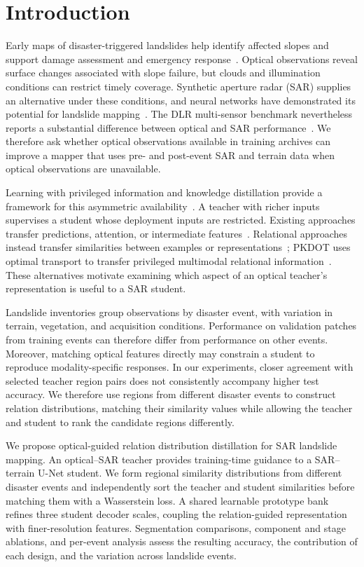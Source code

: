 \documentclass[journal]{IEEEtran}
\begin{document}
\section{Introduction}
Early maps of disaster-triggered landslides help identify affected slopes and support damage assessment and emergency response~\cite{Mondini2021,Handwerger2022,Amatya2023}. Optical observations reveal surface changes associated with slope failure, but clouds and illumination conditions can restrict timely coverage. Synthetic aperture radar (SAR) supplies an alternative under these conditions, and neural networks have demonstrated its potential for landslide mapping~\cite{Nava2022DL,Nava2022Attention,Boehm2022}. The DLR multi-sensor benchmark nevertheless reports a substantial difference between optical and SAR performance~\cite{Orynbaikyzy2025}. We therefore ask whether optical observations available in training archives can improve a mapper that uses pre- and post-event SAR and terrain data when optical observations are unavailable.

Learning with privileged information and knowledge distillation provide a framework for this asymmetric availability~\cite{LopezPaz2016,Hinton2015}. A teacher with richer inputs supervises a student whose deployment inputs are restricted. Existing approaches transfer predictions, attention, or intermediate features~\cite{Zagoruyko2017,Lan2025ACAM,Kieu2026DIS2,Sun2027}. Relational approaches instead transfer similarities between examples or representations~\cite{Park2019RKD,Tung2019SP}; PKDOT uses optimal transport to transfer privileged multimodal relational information~\cite{Aslam2024PKDOT}. These alternatives motivate examining which aspect of an optical teacher's representation is useful to a SAR student.

Landslide inventories group observations by disaster event, with variation in terrain, vegetation, and acquisition conditions. Performance on validation patches from training events can therefore differ from performance on other events. Moreover, matching optical features directly may constrain a student to reproduce modality-specific responses. In our experiments, closer agreement with selected teacher region pairs does not consistently accompany higher test accuracy. We therefore use regions from different disaster events to construct relation distributions, matching their similarity values while allowing the teacher and student to rank the candidate regions differently.

We propose optical-guided relation distribution distillation for SAR landslide mapping. An optical--SAR teacher provides training-time guidance to a SAR--terrain U-Net student. We form regional similarity distributions from different disaster events and independently sort the teacher and student similarities before matching them with a Wasserstein loss. A shared learnable prototype bank refines three student decoder scales, coupling the relation-guided representation with finer-resolution features. Segmentation comparisons, component and stage ablations, and per-event analysis assess the resulting accuracy, the contribution of each design, and the variation across landslide events.
\end{document}
